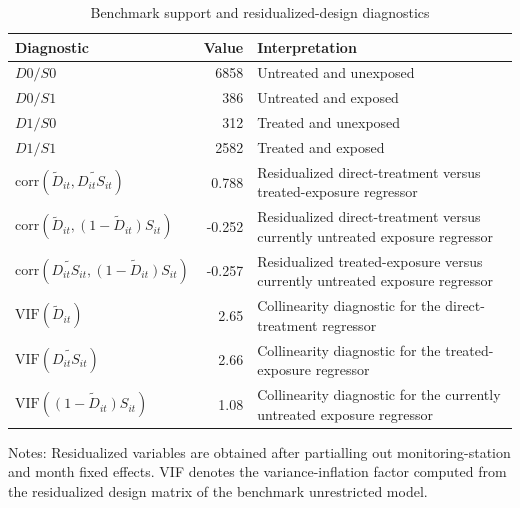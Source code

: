 \begin{table}[!htbp]\centering
\caption{Benchmark support and residualized-design diagnostics}
\label{tab:ulez_design_diagnostics}
\begin{threeparttable}
\small
\setlength{\tabcolsep}{3pt}
\renewcommand{\arraystretch}{1.10}
\begin{tabularx}{\textwidth}{@{}>{\RaggedRight\arraybackslash}Xr>{\RaggedRight\arraybackslash}X@{}}
\toprule
Diagnostic & Value & Interpretation \\
\midrule
$D0/S0$ & 6858 & Untreated and unexposed \\
$D0/S1$ & 386 & Untreated and exposed \\
$D1/S0$ & 312 & Treated and unexposed \\
$D1/S1$ & 2582 & Treated and exposed \\
$\mathrm{corr}(\widetilde{D}_{it},\widetilde{D_{it}S_{it}})$ & 0.788 & Residualized direct-treatment versus treated-exposure regressor \\
$\mathrm{corr}(\widetilde{D}_{it},\widetilde{(1-D_{it})S_{it}})$ & -0.252 & Residualized direct-treatment versus currently untreated exposure regressor \\
$\mathrm{corr}(\widetilde{D_{it}S_{it}},\widetilde{(1-D_{it})S_{it}})$ & -0.257 & Residualized treated-exposure versus currently untreated exposure regressor \\
$\mathrm{VIF}(\widetilde{D}_{it})$ & 2.65 & Collinearity diagnostic for the direct-treatment regressor \\
$\mathrm{VIF}(\widetilde{D_{it}S_{it}})$ & 2.66 & Collinearity diagnostic for the treated-exposure regressor \\
$\mathrm{VIF}(\widetilde{(1-D_{it})S_{it}})$ & 1.08 & Collinearity diagnostic for the currently untreated exposure regressor \\
\bottomrule
\end{tabularx}
\begin{tablenotes}[flushleft]
\footnotesize
\item Notes: Residualized variables are obtained after partialling out monitoring-station and month fixed effects. VIF denotes the variance-inflation factor computed from the residualized design matrix of the benchmark unrestricted model.
\end{tablenotes}
\end{threeparttable}
\end{table}
